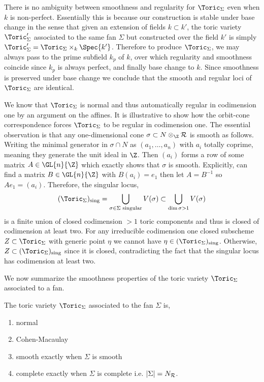 \begin{rmk}
There is no ambiguity between smoothness and regularity for $\Toric_\Sigma$ even when $k$ is non-perfect. Essentially this is because our construction is stable under base change in the sense that given an extension of fields $k \subset k'$, the toric variety $\Toric_\Sigma'$ associated to the same fan $\Sigma$ but constructed over the field $k'$ is simply $\Toric_\Sigma' = \Toric_\Sigma \times_{k} \Spec{k'}$. Therefore to produce $\Toric_{\Sigma}$, we may always pass to the prime subfield $k_p$ of $k$, over which regularity and smoothness coincide since $k_p$ is always perfect, and finally base change to $k$. Since smoothness is preserved under base change we conclude that the smooth and regular loci of $\Toric_\Sigma$ are identical. 
\end{rmk}

\begin{rmk}
We know that $\Toric_\Sigma$ is normal and thus automatically regular in codimension one by an argument on the affines. It is illustrative to show how the orbit-cone correspondence forces $\Toric_\Sigma$ to be regular in codimension one. The essential observation is that any one-dimensional cone $\sigma \subset N \otimes_\Z \R$ is smooth as follows. Writing the minimal generator in $\sigma \cap N$ as $(a_1, \dots, a_n)$ with $a_i$ totally coprime, meaning they generate the unit ideal in $\Z$. Then $(a_{i})$ forms a row of some matrix $A \in \GL{n}{\Z}$ which exactly shows that $\sigma$ is smooth. Explicitly, can find a matrix $B \in \GL{n}{\Z}$ with $B (a_i) = e_1$ then let $A = B^{-1}$ so $A e_1 = (a_i)$. Therefore, the singular locus,
\[ (\Toric_\Sigma)_{\text{sing}} = \bigcup_{\sigma \in \Sigma \text{ singular}} V(\sigma) \subset \bigcup_{\dim{\sigma} > 1} V(\sigma) \]
is a finite union of closed codimension $>1$ toric components and thus is closed of codimension at least two. For any irreducible codimension one closed subscheme $Z \subset \Toric_\Sigma$ with generic point $\eta$ we cannot have $\eta \in (\Toric_\Sigma)_{\text{sing}}$. Otherwise, $Z \subset (\Toric_\Sigma)_{\text{sing}}$ since it is closed, contradicting the fact that the singular locus has codimension at least two.
\end{rmk}
\noindent
We now summarize the smoothness properties of the toric variety $\Toric_\Sigma$ associated to a fan.

\begin{theorem}
The toric variety $\Toric_\Sigma$ associated to the fan $\Sigma$   is,
\begin{enumerate}
\item normal
\item Cohen-Macaulay
\item smooth exactly when $\Sigma$ is smooth
\item complete exactly when $\Sigma$ is complete i.e. $|\Sigma| = N_{\mathcal{R}}$. 
\end{enumerate}
\end{theorem}

